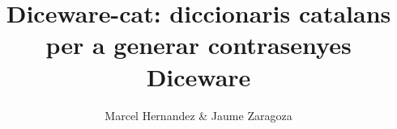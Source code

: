 \documentclass[a4paper,11pt]{article}
\title{Diceware-cat: diccionaris catalans per a generar contrasenyes Diceware}
\author{Marcel Hernandez \& Jaume Zaragoza}
\date{}
\begin{document}
\maketitle

\begin{multicols}{5}
  
\end{multicols}
\end{document}
